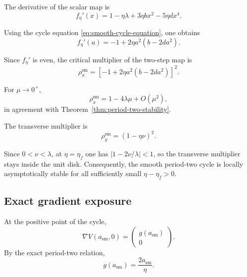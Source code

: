 The derivative of the scalar map is
\begin{equation}
f_\eta'(x)
=
1-\eta\lambda
+
3\eta bx^2
-
5\eta dx^4.
\label{eq:scalar-derivative}
\end{equation}

Using the cycle equation
\eqref{eq:smooth-cycle-equation}, one obtains
\begin{equation}
f_\eta'(a)
=
-1
+
2\eta a^2
\left(
b-2da^2
\right).
\label{eq:scalar-derivative-cycle}
\end{equation}

Since $f_\eta'$ is even, the critical multiplier of the two-step
map is
\begin{equation}
\rho_x^{\mathrm{sm}}
=
\left[
-1
+
2\eta a^2
\left(
b-2da^2
\right)
\right]^2.
\label{eq:planar-smooth-x-multiplier}
\end{equation}

For $\mu\to0^+$,
\begin{equation}
\rho_x^{\mathrm{sm}}
=
1-4\lambda\mu
+
O(\mu^2),
\label{eq:planar-smooth-x-expansion}
\end{equation}
in agreement with
Theorem~\ref{thm:period-two-stability}.

The transverse multiplier is
\begin{equation}
\rho_y^{\mathrm{sm}}
=
(1-\eta\nu)^2.
\label{eq:planar-smooth-y-multiplier}
\end{equation}

Since $0<\nu<\lambda$, at $\eta=\eta_f$ one has
$|1-2\nu/\lambda|<1$, so the transverse multiplier stays inside the
unit disk.  Consequently, the smooth period-two cycle is locally
asymptotically stable for all sufficiently small $\eta-\eta_f>0$.

\subsection{Exact gradient exposure}
\label{subsec:planar-exposure}

At the positive point of the cycle,
\[
\nabla V(a_{\mathrm{sm}},0)
=
\begin{pmatrix}
g(a_{\mathrm{sm}})
\\
0
\end{pmatrix}.
\]
By the exact period-two relation,
\begin{equation}
g(a_{\mathrm{sm}})
=
\frac{2a_{\mathrm{sm}}}{\eta}.
\label{eq:planar-exact-gradient-balance}
\end{equation}

